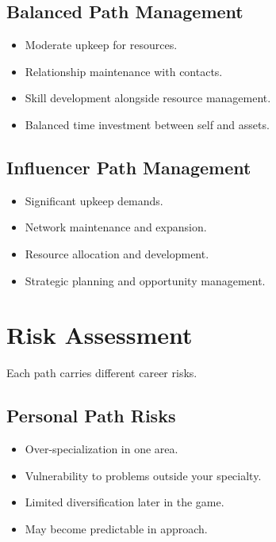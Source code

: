 \subsection*{Balanced Path Management}
\begin{itemize}
\item Moderate upkeep for resources.
\item Relationship maintenance with contacts.
\item Skill development alongside resource management.
\item Balanced time investment between self and assets.
\end{itemize}

\subsection*{Influencer Path Management}
\begin{itemize}
\item Significant upkeep demands.
\item Network maintenance and expansion.
\item Resource allocation and development.
\item Strategic planning and opportunity management.
\end{itemize}


\section{Risk Assessment}
\label{sec:xp-risk}

Each path carries different career risks.

\subsection*{Personal Path Risks}
\begin{itemize}
\item Over-specialization in one area.
\item Vulnerability to problems outside your specialty.
\item Limited diversification later in the game.
\item May become predictable in approach.
\end{itemize}

